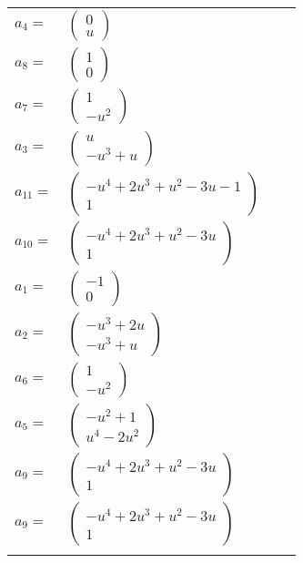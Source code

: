 \documentclass[1p]{elsarticle_modified}
\theoremstyle{definition}
\begin{document}
\begin{tabular}{m{7pt} m{180pt} m{7pt} m{180pt} }
\flushright $a_{4}=$&$\begin{pmatrix}0\\u\end{pmatrix}$ \\
\flushright $a_{8}=$&$\begin{pmatrix}1\\0\end{pmatrix}$ \\
\flushright $a_{7}=$&$\begin{pmatrix}1\\- u^2\end{pmatrix}$ \\
\flushright $a_{3}=$&$\begin{pmatrix}u\\- u^3+u\end{pmatrix}$ \\
\flushright $a_{11}=$&$\begin{pmatrix}- u^4+2 u^3+u^2-3 u-1\\1\end{pmatrix}$ \\
\flushright $a_{10}=$&$\begin{pmatrix}- u^4+2 u^3+u^2-3 u\\1\end{pmatrix}$ \\
\flushright $a_{1}=$&$\begin{pmatrix}-1\\0\end{pmatrix}$ \\
\flushright $a_{2}=$&$\begin{pmatrix}- u^3+2 u\\- u^3+u\end{pmatrix}$ \\
\flushright $a_{6}=$&$\begin{pmatrix}1\\- u^2\end{pmatrix}$ \\
\flushright $a_{5}=$&$\begin{pmatrix}- u^2+1\\u^4-2 u^2\end{pmatrix}$ \\
\flushright $a_{9}=$&$\begin{pmatrix}- u^4+2 u^3+u^2-3 u\\1\end{pmatrix}$\\ \flushright $a_{9}=$&$\begin{pmatrix}- u^4+2 u^3+u^2-3 u\\1\end{pmatrix}$\\&\end{tabular}
\end{document}

